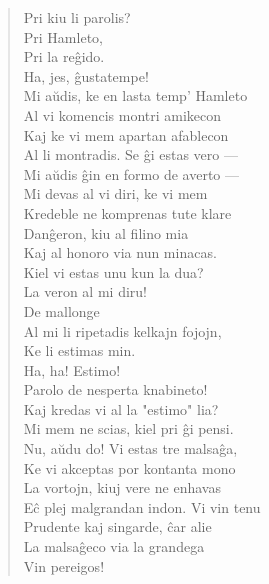 \begin{verse}
                Pri kiu li parolis?\\
 Pri Hamleto,\\
                Pri la re\^gido.\\
 Ha, jes, \^gustatempe!\\
                Mi a\u udis, ke en lasta temp' Hamleto\\
                Al vi komencis montri amikecon\\
                Kaj ke vi mem apartan afablecon\\
                Al li montradis. Se \^gi estas vero ---\\
                Mi a\u udis \^gin en formo de averto ---\\
                Mi devas al vi diri, ke vi mem\\
                Kredeble ne komprenas tute klare\\
                Dan\^geron, kiu al filino mia\\
                Kaj al honoro via nun minacas.\\
                Kiel vi estas unu kun la dua?\\
                La veron al mi diru!\\
 De mallonge\\
                Al mi li ripetadis kelkajn fojojn,\\
                Ke li estimas min.\\
 Ha, ha! Estimo!\\
                Parolo de nesperta knabineto!\\
                Kaj kredas vi al la "estimo" lia?\\
 Mi mem ne scias, kiel pri \^gi pensi.\\
 Nu, a\u udu do! Vi estas tre malsa\^ga,\\
                Ke vi akceptas por kontanta mono\\
                La vortojn, kiuj vere ne enhavas\\
                E\^c plej malgrandan indon. Vi vin tenu\\
                Prudente kaj singarde, \^car alie\\
                La malsa\^geco via la grandega\\
                Vin pereigos!\\

\end{verse}
